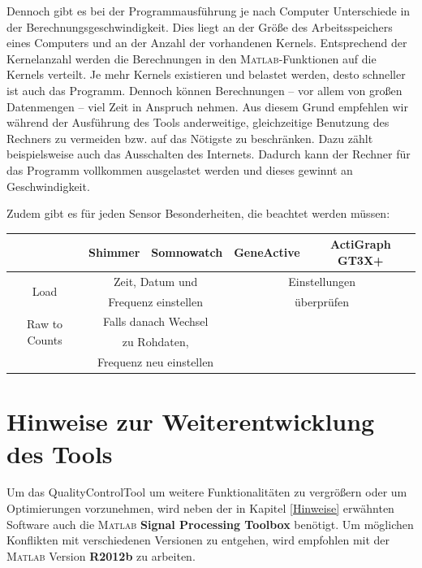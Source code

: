 \documentclass[onecolumn,german]{article}
\begin{document}
Dennoch gibt es bei der Programmausführung je nach Computer Unterschiede in der Berechnungsgeschwindigkeit. Dies liegt an der Größe des Arbeitsspeichers eines Computers und an der Anzahl der vorhandenen Kernels. Entsprechend der Kernelanzahl werden die Berechnungen in den \textsc{Matlab}-Funktionen auf die Kernels verteilt. Je mehr Kernels existieren und belastet werden, desto schneller ist auch das Programm.
Dennoch können Berechnungen -- vor allem von großen Datenmengen --  viel Zeit in Anspruch nehmen. Aus diesem Grund empfehlen wir während der Ausführung des Tools anderweitige, gleichzeitige Benutzung des Rechners zu vermeiden bzw. auf das Nötigste zu beschränken. Dazu zählt beispielsweise auch das Ausschalten des Internets. Dadurch kann der Rechner für das Programm vollkommen ausgelastet werden und dieses gewinnt an Geschwindigkeit.\newline

Zudem gibt es für jeden Sensor Besonderheiten, die beachtet werden müssen:\newline


\begin{table}[!h]
\begin{tabular}{|c|c|c|c|c|}
\hline
 & Shimmer & Somnowatch & GeneActive & ActiGraph GT3X+ \\
\hline

\multirow{2}{*}{Load} & \multicolumn{2}{|c|}{ Zeit, Datum und} & \multicolumn{2}{|c|}{Einstellungen}\\& \multicolumn{2}{|c|}{ Frequenz einstellen} & \multicolumn{2}{|c|}{überprüfen}\\ 
\hline


\multirow{2}{*}{Raw to Counts} & \multicolumn{2}{|c|}{Falls danach Wechsel} &\multicolumn{2}{|c|}{}\\&
\multicolumn{2}{|c|}{ zu Rohdaten,}&\multicolumn{2}{|c|}{}\\& \multicolumn{2}{|c|}{ Frequenz neu einstellen} &\multicolumn{2}{|c|}{} \\

\hline

\end{tabular}
\end{table}
\newpage
\section{Hinweise zur Weiterentwicklung des Tools}

Um das QualityControlTool um weitere Funktionalitäten zu vergrößern oder um Optimierungen vorzunehmen, wird neben der in Kapitel \ref{Hinweise} erwähnten Software auch die \textsc{Matlab} \textbf{Signal Processing Toolbox\footnotemark}
 benötigt. Um möglichen Konflikten mit verschiedenen Versionen zu entgehen, wird empfohlen mit der \textsc{Matlab} Version \textbf{R2012b} zu arbeiten.\newline
\end{document}
